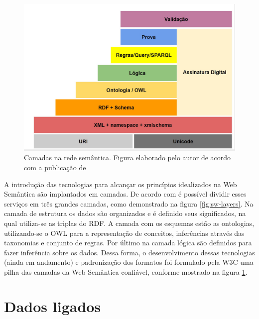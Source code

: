 \begin{figure}
	\centering
	\includegraphics[scale=0.30]{imagens/sw_w3c_stack.jpg}
	\caption{Camadas na rede semântica. Figura elaborado pelo autor de acordo com a publicação de \cite{SemanticWebStack}}
	\label{fig:sw-w3c-stack}
\end{figure}

A introdução das tecnologias para alcançar os princípios idealizados na Web Semântica são implantados em camadas. De acordo com \cite{bernerslee2001semantic} é possível dividir esses serviços em três grandes camadas, como demonstrado na figura \ref{fig:sw-layers}. Na camada de estrutura os dados são organizados e é definido seus significados, na qual utiliza-se as triplas do RDF. A camada com os esquemas estão as ontologias, utilizando-se o OWL para a representação de conceitos, inferências através das taxonomias e conjunto de regras. Por último na camada lógica são definidos para fazer inferência sobre os dados. Dessa forma, o desenvolvimento dessas tecnologias (ainda em andamento) e padronização dos formatos foi formulado pela W3C uma pilha das camadas \citep{SemanticWebStack} da Web Semântica confiável, conforme mostrado na figura \ref{fig:sw-w3c-stack}.

\section{Dados ligados}

